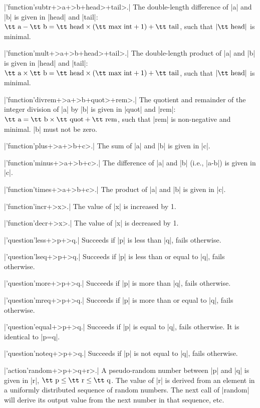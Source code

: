 \documentclass{article}
\begin{document}
\X\pp|'function'subtr+>a+>b+head>+tail>.|\Y
The double-length difference of \pp|a| and \pp|b| is given in \pp|head| and
\pp|tail|: $\mbox{\tt a}-\mbox{\tt b}=\mbox{\tt head}\times(\mbox{\tt max
int}+1)+\mbox{\tt tail}$, such that $|\mbox{\tt head}|$ is minimal.


\X\pp|'function'mult+>a+>b+head>+tail>.|\Y
The double-length product of \pp|a| and \pp|b| is given in \pp|head| and
\pp|tail|: $\mbox{\tt a}\times\mbox{\tt b}=\mbox{\tt head}\times(\mbox{\tt max
int}+1)+\mbox{\tt tail}$, such that $|\mbox{\tt head}|$ is minimal.

\X\pp|'function'divrem+>a+>b+quot>+rem>.|\Y
The quotient and remainder of the integer division of \pp|a| by \pp|b| is
given in \pp|quot| and \pp|rem|: $\mbox{\tt a}=\mbox{\tt b}\times \mbox{\tt
quot}+\mbox{\tt rem}$, such that \pp|rem| is non-negative and minimal.
\pp|b| must not be zero.

\X\pp|'function'plus+>a+>b+c>.|\Y
The sum of \pp|a| and \pp|b| is given in \pp|c|.

\X\pp|'function'minus+>a+>b+c>.|\Y
The difference of \pp|a| and \pp|b| (i.e., \pp|a-b|) is given in \pp|c|.

\X\pp|'function'times+>a+>b+c>.|\Y
The product of \pp|a| and \pp|b| is given in \pp|c|.

\X\pp|'function'incr+>x>.|\Y
The value of \pp|x| is increased by 1.

\X\pp|'function'decr+>x>.|\Y
The value of \pp|x| is decreased by 1.

\smallskip
\X\pp|'question'less+>p+>q.|\Y
Succeeds if \pp|p| is less than \pp|q|, fails otherwise.

\X\pp|'question'lseq+>p+>q.|\Y
Succeeds if \pp|p| is less than or equal to \pp|q|, fails otherwise.

\X\pp|'question'more+>p+>q.|\Y
Succeeds if \pp|p| is more than \pp|q|, fails otherwise.

\X\pp|'question'mreq+>p+>q.|\Y
Succeeds if \pp|p| is more than or equal to \pp|q|, fails otherwise.

\X\pp|'question'equal+>p+>q.|\Y
Succeeds if \pp|p| is equal to \pp|q|, fails otherwise. It is identical to
\pp|p=q|.

\X\pp|'question'noteq+>p+>q.|\Y
Succeeds if \pp|p| is not equal to \pp|q|, fails otherwise.

\smallskip

\X\pp|'action'random+>p+>q+r>.|\Y
A pseudo-random number between \pp|p| and \pp|q| is given in \pp|r|,
$\mbox{\tt p}\le\mbox{\tt r}\le\mbox{\tt q}$. The value of \pp|r| is derived
from an element in a uniformly distributed sequence of random numbers. The next call of
\pp|random| will derive its output value from the next number in that
sequence, etc.
\end{document}

